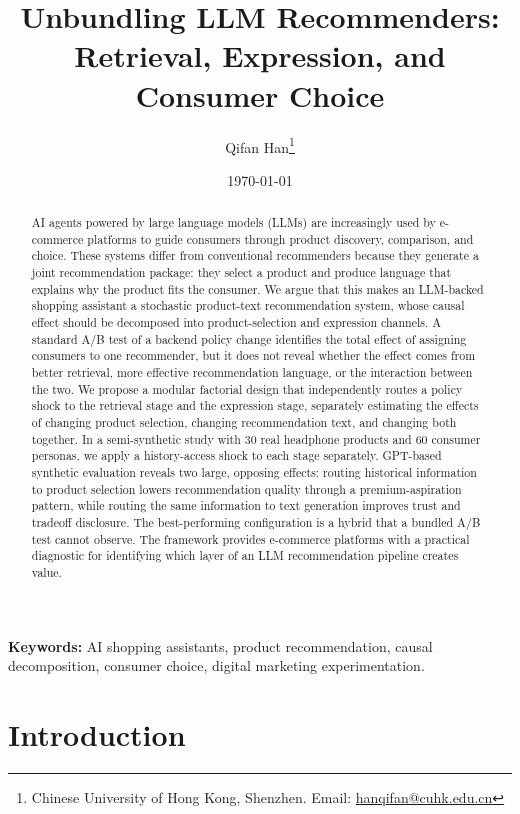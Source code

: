 \documentclass[11pt]{article}
\title{\textbf{Unbundling LLM Recommenders:\\ Retrieval, Expression, and Consumer Choice}}
\author{Qifan Han\thanks{Chinese University of Hong Kong, Shenzhen. Email: \href{mailto:hanqifan@cuhk.edu.cn}{hanqifan@cuhk.edu.cn}}}
\date{\today}
\begin{document}
\maketitle

\begin{abstract}
\noindent
AI agents powered by large language models (LLMs) are increasingly used by e-commerce platforms to guide consumers through product discovery, comparison, and choice. These systems differ from conventional recommenders because they generate a joint recommendation package: they select a product and produce language that explains why the product fits the consumer. We argue that this makes an LLM-backed shopping assistant a stochastic product-text recommendation system, whose causal effect should be decomposed into product-selection and expression channels. A standard A/B test of a backend policy change identifies the total effect of assigning consumers to one recommender, but it does not reveal whether the effect comes from better retrieval, more effective recommendation language, or the interaction between the two. We propose a modular factorial design that independently routes a policy shock to the retrieval stage and the expression stage, separately estimating the effects of changing product selection, changing recommendation text, and changing both together. In a semi-synthetic study with 30 real headphone products and 60 consumer personas, we apply a history-access shock to each stage separately. GPT-based synthetic evaluation reveals two large, opposing effects: routing historical information to product selection lowers recommendation quality through a premium-aspiration pattern, while routing the same information to text generation improves trust and tradeoff disclosure. The best-performing configuration is a hybrid that a bundled A/B test cannot observe. The framework provides e-commerce platforms with a practical diagnostic for identifying which layer of an LLM recommendation pipeline creates value.
\end{abstract}

\medskip
\noindent\textbf{Keywords:} AI shopping assistants, product recommendation, causal decomposition, consumer choice, digital marketing experimentation.

\newpage
\section{Introduction}
\end{document}
